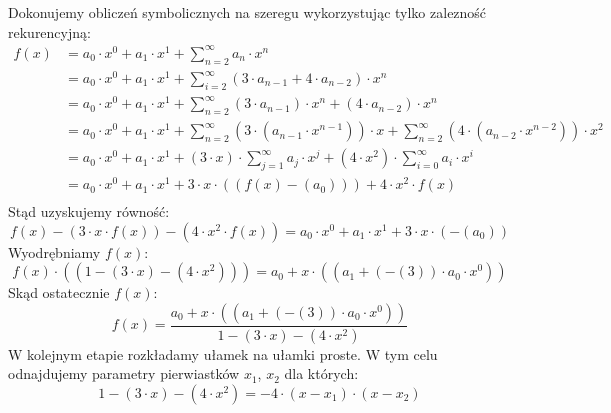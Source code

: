 \documentclass[12pt]{article}
\begin{document}
\noindent Dokonujemy obliczeń symbolicznych na szeregu wykorzystując tylko zalezność rekurencyjną:
\begin{equation}
\begin{split}
f(x)  &= {{a}}_{{0}}\cdot{x}^ {{0}} + {{a}}_{{1}}\cdot{x}^ {{1}} + \sum_{{n} = {2}}^{{\infty}}{{a}}_{{n}}\cdot{x}^ {{n}}\\ 
     & = {{a}}_{{0}}\cdot{x}^ {{0}} + {{a}}_{{1}}\cdot{x}^ {{1}} + \sum_{{i} = {2}}^{{\infty}}({3}\cdot{{a}}_{{n-1}} + {4}\cdot{{a}}_{{n-2}})\cdot{x}^ {{n}}\\ 
     & = {{a}}_{{0}}\cdot{x}^ {{0}} + {{a}}_{{1}}\cdot{x}^ {{1}} + \sum_{{n} = {2}}^{{\infty}}({3}\cdot{{a}}_{{n-1}})\cdot{x}^ {{n}} + ({4}\cdot{{a}}_{{n-2}})\cdot{x}^ {{n}}\\ 
     & = {{a}}_{{0}}\cdot{x}^ {{0}} + {{a}}_{{1}}\cdot{x}^ {{1}} + \sum_{{n} = {2}}^{{\infty}}({3}\cdot({{a}}_{{n-1}}\cdot{x}^ {{n-1}}))\cdot{x} + \sum_{{n} = {2}}^{{\infty}}({4}\cdot({{a}}_{{n-2}}\cdot{x}^ {{n-2}}))\cdot{x}^ {{2}}\\ 
     & = {{a}}_{{0}}\cdot{x}^ {{0}} + {{a}}_{{1}}\cdot{x}^ {{1}} + ({3}\cdot{x})\cdot\sum_{{j} = {1}}^{{\infty}}{{a}}_{{j}}\cdot{x}^ {{j}} + ({4}\cdot{x}^ {{2}})\cdot\sum_{{i} = {0}}^{{\infty}}{{a}}_{{i}}\cdot{x}^ {{i }}\\ 
     & = {{a}}_{{0}}\cdot{x}^ {{0}} + {{a}}_{{1}}\cdot{x}^ {{1}} + {3}\cdot{x}\cdot(({f(x)}- ( {{a}}_{{0}} ) )) + {4}\cdot{x}^ {{2}}\cdot{f(x)}\\ 
\end{split}
\end{equation}
\noindent Stąd uzyskujemy równość:
\begin{equation}
{f(x)}- ( {3}\cdot{x}\cdot{f(x)} ) - ( {4}\cdot{x}^ {{2}}\cdot{f(x)} ) =  {{a}}_{{0}}\cdot{x}^ {{0}} + {{a}}_{{1}}\cdot{x}^ {{1}} + {3}\cdot{x}\cdot(- ( {{a}}_{{0}} ) )\end{equation}
Wyodrębniamy $f(x)$:
\begin{equation}
{f(x)}\cdot(({1}- ( {3}\cdot{x} ) - ( {4}\cdot{x}^ {{2}} ) )) = {{a}}_{{0}} + {x}\cdot(({{a}}_{{1}} + (- ( {3} ) )\cdot{{a}}_{{0}}\cdot{x}^ {{0}}))\end{equation}
Skąd ostatecznie $f(x)$:
\begin{equation}
f(x) =    \frac{{{a}}_{{0}} + {x}\cdot(({{a}}_{{1}} + (- ( {3} ) )\cdot{{a}}_{{0}}\cdot{x}^ {{0}}))}{{1}- ( {3}\cdot{x} ) - ( {4}\cdot{x}^ {{2}} ) }
\end{equation}
W kolejnym etapie rozkładamy ułamek na ułamki proste.
W tym celu odnajdujemy parametry pierwiastków $x_1$, $x_2$ dla których:\begin{equation}
{1}- ( {3}\cdot{x} ) - ( {4}\cdot{x}^ {{2}} ) = -{4}\cdot (x-x_1)\cdot(x-x_2)\end{equation}
\end{document}
